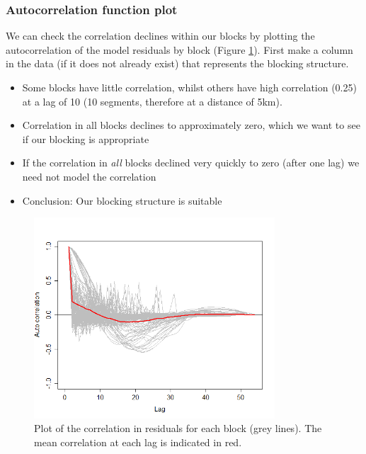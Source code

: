 \begin{frame}[fragile]
\frametitle{Autocorrelation function plot}
We can check the correlation declines within our blocks by plotting the autocorrelation of the model residuals by block (Figure \ref{fig:acf}).  First make a column in the data (if it does not already exist) that represents the blocking structure.

\begin{knitrout}\footnotesize
{}\color{fgcolor}
\end{knitrout}


\begin{itemize}
\item Some blocks have little correlation, whilst others have high correlation (0.25) at a lag of 10 (10 segments, therefore at a distance of 5km).
\item Correlation in all blocks declines to approximately zero, which we want to see if our blocking is appropriate
\item If the correlation in \emph{all} blocks declined very quickly to zero (after one lag) we need not model the correlation
\pause
\item Conclusion: Our blocking structure is suitable
\end{itemize}
\end{frame}

\begin{frame}[fragile]
\begin{figure}[h]
  \centering
  \includegraphics[width=9cm]{danish/acfPlot.png}
\caption{Plot of the correlation in residuals for each block (grey lines).  The mean correlation at each lag is indicated in red.}
\label{fig:acf}
\end{figure}
\end{frame}



